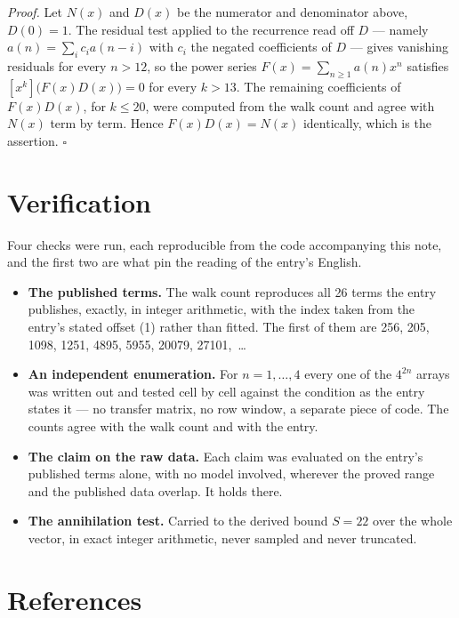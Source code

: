 \documentclass[11pt]{article}
\theoremstyle{definition}
\begin{document}
{\itshape Proof.} Let $N(x)$ and $D(x)$ be the numerator and denominator above, $D(0)=1$. The residual test applied to the recurrence read off $D$ --- namely $a(n) = \sum_i c_i a(n-i)$ with $c_i$ the negated coefficients of $D$ --- gives vanishing residuals for every $n > 12$, so the power series $F(x)=\sum_{n\ge 1}a(n)x^n$ satisfies $[x^k]\bigl(F(x)D(x)\bigr) = 0$ for every $k > 13$. The remaining coefficients of $F(x)D(x)$, for $k \le 20$, were computed from the walk count and agree with $N(x)$ term by term. Hence $F(x)D(x) = N(x)$ identically, which is the assertion. $\square$

\section{Verification}

Four checks were run, each reproducible from the code accompanying this note, and the first two are what pin the reading of the entry's English.

\begin{itemize}

\item {\bfseries The published terms.} The walk count reproduces all 26 terms the entry publishes, exactly, in integer arithmetic, with the index taken from the entry's stated offset (1) rather than fitted. The first of them are 256, 205, 1098, 1251, 4895, 5955, 20079, 27101,~\dots

\item {\bfseries An independent enumeration.} For $n = 1,\dots,4$ every one of the $4^{2n}$ arrays was written out and tested cell by cell against the condition as the entry states it --- no transfer matrix, no row window, a separate piece of code. The counts agree with the walk count and with the entry.

\item {\bfseries The claim on the raw data.} Each claim was evaluated on the entry's published terms alone, with no model involved, wherever the proved range and the published data overlap. It holds there.

\item {\bfseries The annihilation test.} Carried to the derived bound $S = 22$ over the whole vector, in exact integer arithmetic, never sampled and never truncated.

\end{itemize}

\section{References}
\end{document}
